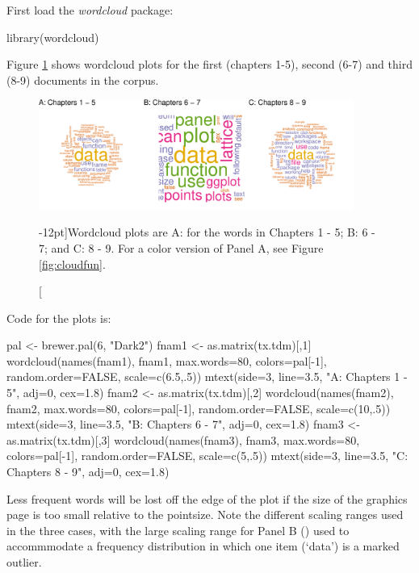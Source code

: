 First load the {\em wordcloud} package:
\begin{Schunk}
\begin{Sinput}
library(wordcloud)
\end{Sinput}
\end{Schunk}

Figure \ref{fig:wc} shows wordcloud plots for the first (chapters 1-5),
second (6-7) and third (8-9) documents in the corpus.
\vspace*{15pt}

\begin{figure}
\begin{Schunk}


\centerline{\includegraphics[width=0.92\textwidth]{figs/14-wordcloud1-3-1} }

\end{Schunk}
\caption[][-12pt]{Wordcloud plots are A: for the words in Chapters 1 - 5; B: 6 -
  7; and C: 8 - 9. For a color version of Panel A, see Figure 
  \ref{fig:cloudfun}.\label{fig:wc}}
\end{figure}

\vspace*{-9pt}

\noindent
Code for the plots is:
\begin{fullwidth}
\begin{Schunk}
\begin{Sinput}
pal <- brewer.pal(6, "Dark2")
fnam1 <- as.matrix(tx.tdm)[,1]
wordcloud(names(fnam1), fnam1, max.words=80, colors=pal[-1],
          random.order=FALSE, scale=c(6.5,.5))
mtext(side=3, line=3.5, "A: Chapters 1 - 5", adj=0, cex=1.8)
fnam2 <- as.matrix(tx.tdm)[,2]
wordcloud(names(fnam2), fnam2, max.words=80, colors=pal[-1],
          random.order=FALSE, scale=c(10,.5))
mtext(side=3, line=3.5, "B: Chapters 6 - 7", adj=0, cex=1.8)
fnam3 <- as.matrix(tx.tdm)[,3]
wordcloud(names(fnam3), fnam3, max.words=80, colors=pal[-1],
          random.order=FALSE, scale=c(5,.5))
mtext(side=3, line=3.5, "C: Chapters 8 - 9", adj=0, cex=1.8)
\end{Sinput}
\end{Schunk}
\end{fullwidth}
 Less frequent words will be lost off the
edge of the plot if the size of the graphics page is too small
relative to the pointsize.  Note the different scaling ranges used in
the three cases, with the large scaling range for Panel B
() used to accommmodate a frequency distribution
in which one item (`data') is a marked outlier.

